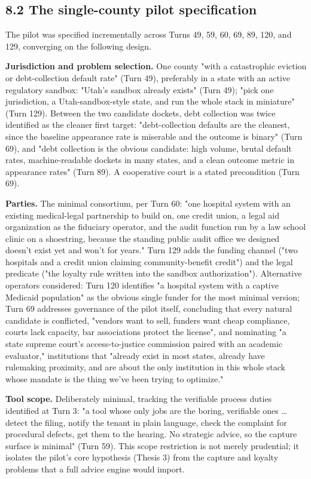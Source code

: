 \documentclass[sigconf,nonacm=true]{acmart}
\begin{document}
\subsection{8.2 The single-county pilot specification}

The pilot was specified incrementally across Turns 49, 59, 60, 69, 89, 120, and 129, converging on the following design.

\textbf{Jurisdiction and problem selection.} One county "with a catastrophic eviction or debt-collection default rate" (Turn 49), preferably in a state with an active regulatory sandbox: "Utah's sandbox already exists" (Turn 49); "pick one jurisdiction,  a Utah-sandbox-style state,  and run the whole stack in miniature" (Turn 129). Between the two candidate dockets, debt collection was twice identified as the cleaner first target: "debt-collection defaults are the cleanest, since the baseline appearance rate is miserable and the outcome is binary" (Turn 69), and "debt collection is the obvious candidate: high volume, brutal default rates, machine-readable dockets in many states, and a clean outcome metric in appearance rates" (Turn 89). A cooperative court is a stated precondition (Turn 69).

\textbf{Parties.} The minimal consortium, per Turn 60: "one hospital system with an existing medical-legal partnership to build on, one credit union, a legal aid organization as the fiduciary operator, and the audit function run by a law school clinic on a shoestring,  because the standing public audit office we designed doesn't exist yet and won't for years." Turn 129 adds the funding channel ("two hospitals and a credit union claiming community-benefit credit") and the legal predicate ("the loyalty rule written into the sandbox authorization"). Alternative operators considered: Turn 120 identifies "a hospital system with a captive Medicaid population" as the obvious single funder for the most minimal version; Turn 69 addresses governance of the pilot itself, concluding that every natural candidate is conflicted,  "vendors want to sell, funders want cheap compliance, courts lack capacity, bar associations protect the license",  and nominating "a state supreme court's access-to-justice commission paired with an academic evaluator," institutions that "already exist in most states, already have rulemaking proximity, and are about the only institution in this whole stack whose mandate is the thing we've been trying to optimize."

\textbf{Tool scope.} Deliberately minimal, tracking the verifiable process duties identified at Turn 3: "a tool whose only jobs are the boring, verifiable ones … detect the filing, notify the tenant in plain language, check the complaint for procedural defects, get them to the hearing. No strategic advice, so the capture surface is minimal" (Turn 59). This scope restriction is not merely prudential; it isolates the pilot's core hypothesis (Thesis 3) from the capture and loyalty problems that a full advice engine would import.
\end{document}
